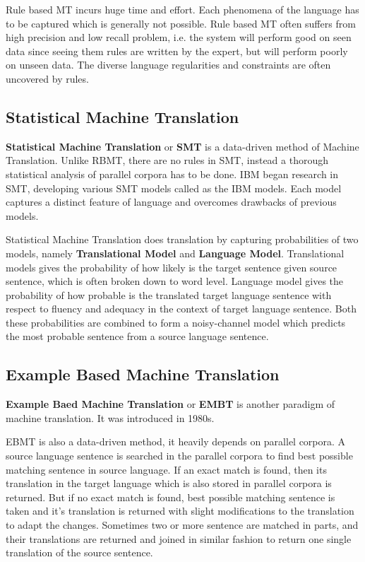     Rule based MT incurs huge time and effort. Each phenomena of the language has to be captured which is generally not possible. Rule based MT often suffers from high precision and low recall problem, i.e. the system will perform good on seen data since seeing them rules are written by the expert, but will perform poorly on unseen data. The diverse language regularities and constraints are often uncovered by rules.
    
    \subsection{Statistical Machine Translation}
    \textbf{Statistical Machine Translation} or \textbf{SMT} is a data-driven method of Machine Translation. Unlike RBMT, there are no rules in SMT, instead a thorough statistical analysis of parallel corpora has to be done. IBM began research in SMT, developing various SMT models called as the IBM models. Each model captures a distinct feature of language and overcomes drawbacks of previous models. 
    
    Statistical Machine Translation does translation by capturing probabilities of two models, namely \textbf{Translational Model} and \textbf{Language Model}. Translational models gives the probability of how likely is the target sentence given source sentence, which is often broken down to word level. Language model gives the probability of how probable is the translated target language sentence with respect to fluency and adequacy in the context of target language sentence. Both these probabilities are combined to form a noisy-channel model which predicts the most probable sentence from a source language sentence.
    
    \subsection{Example Based Machine Translation}
    \textbf{Example Baed Machine Translation} or \textbf{EMBT} is another paradigm of machine translation. It was introduced in 1980s. 
    
    EBMT is also a data-driven method, it heavily depends on parallel corpora. A source language sentence is searched in the parallel corpora to find best possible matching sentence in source language. If an exact match is found, then its translation in the target language which is also stored in parallel corpora is returned. But if no exact match is found, best possible matching sentence is taken and it's translation is returned with slight modifications to the translation to adapt the changes. Sometimes two or more sentence are matched in parts, and their translations are returned and joined in similar fashion to return one single translation of the source sentence. 
    
    
